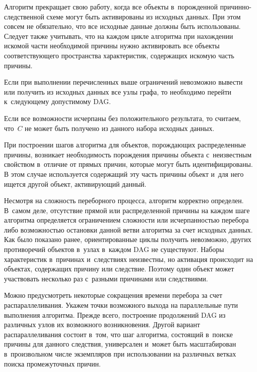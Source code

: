 \begin{multicols}{2}
  Алгоритм прекращает свою работу, когда все объекты в~порожденной 
причинно-следственной схеме могут быть активированы из исходных данных. 
При этом совсем не обязательно, что все исходные данные должны быть 
использованы. Следует также учитывать, что на каждом цикле алгоритма при 
нахождении искомой части необходимой причины нужно активировать все 
объекты соответствующего пространства характеристик, содержащих искомую 
часть причины. 
  
  Если при выполнении перечисленных выше ограничений невозможно вывести 
или получить из исходных данных все узлы графа, то необходимо перейти 
к~следующему допустимому DAG. 
  
  Если все возможности исчерпаны без положительного результата, то считаем, 
что~$C$ не может быть получено из данного набора исходных данных. 
{

}
  
  При построении шагов алгоритма для объектов, порождающих распределенные 
причины, возникает необходимость порождения причины объекта с~неизвестным 
свойством в~отличие от прямых причин, которые могут быть идентифицированы. 
В этом случае используется содержащий эту часть причины объект и~для него 
ищется другой объект, активирующий данный.
  
  Несмотря на сложность переборного процесса, алгоритм корректно определен. 
В~самом деле, отсутствие прямой или распределенной причины на каждом шаге 
алгоритма определяется ограничением сложности или исчерпанностью перебора 
либо возможностью остановки данной ветви алгоритма за счет исходных данных. 
Как было показано ранее, ориентированные циклы получить невозможно, других 
противоречий объектов в~узлах в~каж\-дом DAG не существуют. Наборы 
характеристик в~причинах и~следствиях неизвестны, но активация происходит на 
объектах, содержащих причину или следствие. Поэтому один объект может 
участвовать несколько раз с~разными причинами или следствиями.

  
  Можно предусмотреть некоторые сокращения времени перебора за счет 
распараллеливания. Укажем точки возможного выхода на параллельные пути 
выполнения алгоритма. Прежде всего, построение продолжений DAG из 
различных узлов их возможного возникновения. Другой вариант 
распараллеливания состоит в~том, что шаг алгоритма, состоящий в~поиске 
причины для данного следствия, универсален и~может быть масштабирован 
в~произвольном числе экземпляров при использовании на различных ветках 
поиска промежуточных причин.

  

\end{multicols}
